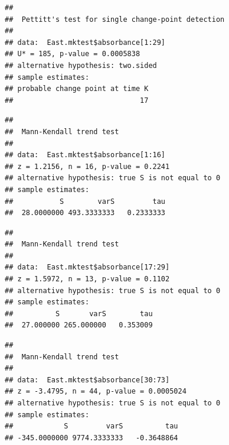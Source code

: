 \documentclass[12pt,]{article}
\newenvironment{Shaded}{\begin{snugshade}}{\end{snugshade}}
\newcommand{\KeywordTok}[1]{\textcolor[rgb]{0.13,0.29,0.53}{\textbf{#1}}}
\newcommand{\DecValTok}[1]{\textcolor[rgb]{0.00,0.00,0.81}{#1}}
\newcommand{\CommentTok}[1]{\textcolor[rgb]{0.56,0.35,0.01}{\textit{#1}}}
\newcommand{\OperatorTok}[1]{\textcolor[rgb]{0.81,0.36,0.00}{\textbf{#1}}}
\newcommand{\NormalTok}[1]{#1}
\begin{document}
\begin{verbatim}
## 
##  Pettitt's test for single change-point detection
## 
## data:  East.mktest$absorbance[1:29]
## U* = 185, p-value = 0.0005838
## alternative hypothesis: two.sided
## sample estimates:
## probable change point at time K 
##                              17
\end{verbatim}

\begin{Shaded}
\end{Shaded}

\begin{verbatim}
## 
##  Mann-Kendall trend test
## 
## data:  East.mktest$absorbance[1:16]
## z = 1.2156, n = 16, p-value = 0.2241
## alternative hypothesis: true S is not equal to 0
## sample estimates:
##           S        varS         tau 
##  28.0000000 493.3333333   0.2333333
\end{verbatim}

\begin{Shaded}
\end{Shaded}

\begin{verbatim}
## 
##  Mann-Kendall trend test
## 
## data:  East.mktest$absorbance[17:29]
## z = 1.5972, n = 13, p-value = 0.1102
## alternative hypothesis: true S is not equal to 0
## sample estimates:
##          S       varS        tau 
##  27.000000 265.000000   0.353009
\end{verbatim}

\begin{Shaded}
\end{Shaded}

\begin{verbatim}
## 
##  Mann-Kendall trend test
## 
## data:  East.mktest$absorbance[30:73]
## z = -3.4795, n = 44, p-value = 0.0005024
## alternative hypothesis: true S is not equal to 0
## sample estimates:
##            S         varS          tau 
## -345.0000000 9774.3333333   -0.3648864
\end{verbatim}
\end{document}
